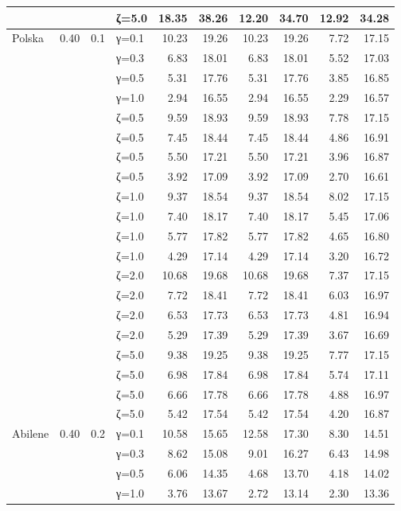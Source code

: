 \begin{table}[htbp]
\begin{tabular}{ll r l  rr  rr  rr}
  &  &  & ζ=5.0 & 18.35 & 38.26 & 12.20 & 34.70 & 12.92 & 34.28 \\
\midrule
 Polska & 0.40 & 0.1 & γ=0.1 & 10.23 & 19.26 & 10.23 & 19.26 & 7.72 & 17.15 \\
  &  &  & γ=0.3 & 6.83 & 18.01 & 6.83 & 18.01 & 5.52 & 17.03 \\
  &  &  & γ=0.5 & 5.31 & 17.76 & 5.31 & 17.76 & 3.85 & 16.85 \\
  &  &  & γ=1.0 & 2.94 & 16.55 & 2.94 & 16.55 & 2.29 & 16.57 \\
  &  &  & ζ=0.5 & 9.59 & 18.93 & 9.59 & 18.93 & 7.78 & 17.15 \\
  &  &  & ζ=0.5 & 7.45 & 18.44 & 7.45 & 18.44 & 4.86 & 16.91 \\
  &  &  & ζ=0.5 & 5.50 & 17.21 & 5.50 & 17.21 & 3.96 & 16.87 \\
  &  &  & ζ=0.5 & 3.92 & 17.09 & 3.92 & 17.09 & 2.70 & 16.61 \\
  &  &  & ζ=1.0 & 9.37 & 18.54 & 9.37 & 18.54 & 8.02 & 17.15 \\
  &  &  & ζ=1.0 & 7.40 & 18.17 & 7.40 & 18.17 & 5.45 & 17.06 \\
  &  &  & ζ=1.0 & 5.77 & 17.82 & 5.77 & 17.82 & 4.65 & 16.80 \\
  &  &  & ζ=1.0 & 4.29 & 17.14 & 4.29 & 17.14 & 3.20 & 16.72 \\
  &  &  & ζ=2.0 & 10.68 & 19.68 & 10.68 & 19.68 & 7.37 & 17.15 \\
  &  &  & ζ=2.0 & 7.72 & 18.41 & 7.72 & 18.41 & 6.03 & 16.97 \\
  &  &  & ζ=2.0 & 6.53 & 17.73 & 6.53 & 17.73 & 4.81 & 16.94 \\
  &  &  & ζ=2.0 & 5.29 & 17.39 & 5.29 & 17.39 & 3.67 & 16.69 \\
  &  &  & ζ=5.0 & 9.38 & 19.25 & 9.38 & 19.25 & 7.77 & 17.15 \\
  &  &  & ζ=5.0 & 6.98 & 17.84 & 6.98 & 17.84 & 5.74 & 17.11 \\
  &  &  & ζ=5.0 & 6.66 & 17.78 & 6.66 & 17.78 & 4.88 & 16.97 \\
  &  &  & ζ=5.0 & 5.42 & 17.54 & 5.42 & 17.54 & 4.20 & 16.87 \\
\midrule
 Abilene & 0.40 & 0.2 & γ=0.1 & 10.58 & 15.65 & 12.58 & 17.30 & 8.30 & 14.51 \\
  &  &  & γ=0.3 & 8.62 & 15.08 & 9.01 & 16.27 & 6.43 & 14.98 \\
  &  &  & γ=0.5 & 6.06 & 14.35 & 4.68 & 13.70 & 4.18 & 14.02 \\
  &  &  & γ=1.0 & 3.76 & 13.67 & 2.72 & 13.14 & 2.30 & 13.36 \\

\end{tabular}
\end{table}
